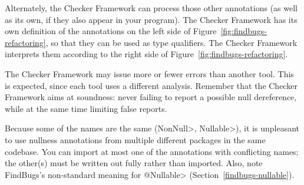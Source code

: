 

Alternately, the Checker Framework can process those other annotations (as
well as its own, if they also appear in your program).  The Checker
Framework has its own definition of the annotations on the left side of
Figure~\ref{fig:findbugs-refactoring}, so that they can be used as type
qualifiers.  The Checker Framework interprets them according to the right
side of Figure~\ref{fig:findbugs-refactoring}.

The Checker Framework may issue more or fewer errors than another tool.
This is expected, since each tool uses a different analysis.  Remember that
the Checker Framework aims at soundness:  never failing to report a possible
null dereference, while at the same time limiting false reports.

Because some of the names are the same (\<NonNull>, \<Nullable>), it is
unpleasant to use nullness annotations from multiple different packages in
the same codebase.  You can import at most one of the annotations with
conflicting names; the other(s) must be written out fully rather than
imported.  Also, note FindBugs's non-standard meaning for
\<@Nullable> (Section~\ref{findbugs-nullable}).


